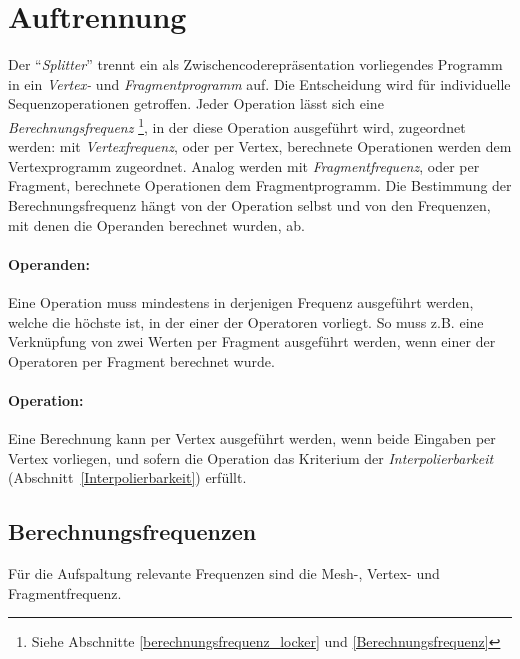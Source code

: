 \documentclass[twoside,a4paper,fleqn,12pt]{book}
\begin{document}
\section{Auftrennung}
\label{Auftrennung}

Der "`\emph{Splitter}"' trennt ein als Zwischencoderepräsentation vorliegendes Programm in ein \emph{Vertex-} und \emph{Fragmentprogramm} auf.
Die Entscheidung wird für individuelle Sequenzoperationen getroffen. Jeder Operation lässt sich eine \emph{Berechnungsfrequenz}
\footnote{Siehe Abschnitte \ref{berechnungsfrequenz_locker} und \ref{Berechnungsfrequenz}},
in der diese Operation ausgeführt wird, zugeordnet werden: mit \emph{Vertexfrequenz}, oder per Vertex, berechnete Operationen werden dem Vertexprogramm zugeordnet.
Analog werden mit \emph{Fragmentfrequenz}, oder per Fragment, berechnete Operationen dem Fragmentprogramm. Die Bestimmung der Berechnungsfrequenz hängt von der Operation selbst
und von den Frequenzen, mit denen die Operanden berechnet wurden, ab. 

\paragraph{Operanden:} Eine Operation muss mindestens in derjenigen Frequenz ausgeführt werden, welche die höchste ist, in der einer der Operatoren
vorliegt. So muss z.B. eine Verknüpfung von zwei Werten per Fragment ausgeführt werden, wenn einer der Operatoren per Fragment berechnet wurde.

\paragraph{Operation:} Eine Berechnung kann per Vertex ausgeführt werden, wenn beide Eingaben per Vertex vorliegen, und
sofern die Operation das Kriterium der \emph{Interpolierbarkeit} (Abschnitt~\ref{Interpolierbarkeit}) erfüllt.

\subsection{Berechnungsfrequenzen}
\label{splitter_Berechnungsfrequenzen}

Für die Aufspaltung relevante Frequenzen sind die Mesh-, %
Vertex- und Fragmentfrequenz.
\end{document}
